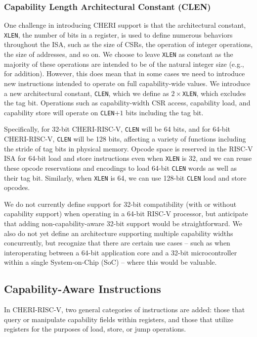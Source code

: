 \subsubsection{Capability Length Architectural Constant (CLEN)}

One challenge in introducing CHERI support is that the architectural constant,
\texttt{XLEN}, the number of bits in a register, is used to define numerous
behaviors throughout the ISA, such as the size of CSRs, the operation of
integer operations, the size of addresses, and so on.
We choose to leave \texttt{XLEN} as constant as the majority of these operations
are intended to be of the natural integer size (e.g., for addition).
However, this does mean that in some cases we need to introduce new
instructions intended to operate on full capability-wide values.
We introduce a new architectural constant, \texttt{CLEN}, which we define as
$2\times$\texttt{XLEN}, which excludes the tag bit.
Operations such as capability-width CSR access, capability load, and capability
store will operate on \texttt{CLEN}$+1$ bits including the tag bit.

Specifically, for 32-bit CHERI-RISC-V, \texttt{CLEN} will be 64 bits, and for
64-bit CHERI-RISC-V, \texttt{CLEN} will be 128 bits, affecting a variety of
functions including the stride of tag bits in physical memory.
Opcode space is reserved in the RISC-V ISA for 64-bit load and store
instructions even when \texttt{XLEN} is 32, and we can reuse these opcode
reservations and encodings to load 64-bit \texttt{CLEN} words as well as
their tag bit.
Similarly, when \texttt{XLEN} is 64, we can use 128-bit \texttt{CLEN} load
and store opcodes.

We do not currently define support for 32-bit compatibility (with or without
capability support) when operating in a 64-bit RISC-V processor, but
anticipate that adding non-capability-aware 32-bit support would be
straightforward.
We also do not yet define an architecture supporting multiple capability
widths concurrently, but recognize that there are certain use cases -- such as
when interoperating between a 64-bit application core and a 32-bit
microcontroller within a single System-on-Chip (SoC) -- where this would be
valuable.

\subsection{Capability-Aware Instructions}

In CHERI-RISC-V, two general categories of instructions are added: those that
query or manipulate capability fields within registers, and those that
utilize registers for the purposes of load, store, or jump operations.


